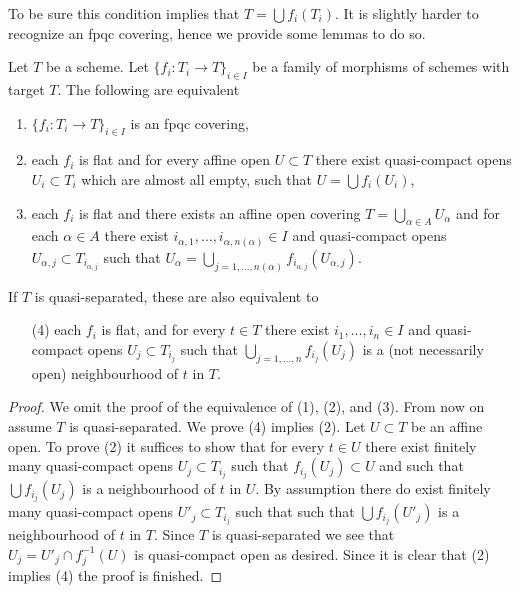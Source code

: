 \noindent
To be sure this condition implies that $T = \bigcup f_i(T_i)$.
It is slightly harder to recognize an fpqc covering, hence we provide
some lemmas to do so.

\begin{lemma}
\label{lemma-recognize-fpqc-covering}
Let $T$ be a scheme. Let $\{f_i : T_i \to T\}_{i \in I}$ be a family of
morphisms of schemes with target $T$. The following are equivalent
\begin{enumerate}
\item $\{f_i : T_i \to T\}_{i \in I}$ is an fpqc covering,
\item each $f_i$ is flat and for every affine open $U \subset T$
there exist quasi-compact opens
$U_i \subset T_i$ which are almost all empty,
such that $U = \bigcup f_i(U_i)$,
\item each $f_i$ is flat and there exists an affine open covering
$T = \bigcup_{\alpha \in A} U_\alpha$ and for each $\alpha \in A$
there exist $i_{\alpha, 1}, \ldots, i_{\alpha, n(\alpha)} \in I$
and quasi-compact opens $U_{\alpha, j} \subset T_{i_{\alpha, j}}$ such that
$U_\alpha =
\bigcup_{j = 1, \ldots, n(\alpha)} f_{i_{\alpha, j}}(U_{\alpha, j})$.
\end{enumerate}
If $T$ is quasi-separated, these are also equivalent to
\begin{enumerate}
\item[(4)] each $f_i$ is flat, and for every $t \in T$ there exist
$i_1, \ldots, i_n \in I$ and quasi-compact opens $U_j \subset T_{i_j}$
such that $\bigcup_{j = 1, \ldots, n} f_{i_j}(U_j)$ is a
(not necessarily open) neighbourhood of $t$ in $T$.
\end{enumerate}
\end{lemma}

\begin{proof}
We omit the proof of the equivalence of (1), (2), and (3).
From now on assume $T$ is quasi-separated.
We prove (4) implies (2). Let $U \subset T$ be an affine open.
To prove (2) it suffices to show that for every $t \in U$ there exist
finitely many quasi-compact opens $U_j \subset T_{i_j}$ such that
$f_{i_j}(U_j) \subset U$ and such that $\bigcup f_{i_j}(U_j)$
is a neighbourhood of $t$ in $U$. By assumption there do exist
finitely many quasi-compact opens $U'_j \subset T_{i_j}$ such that
such that $\bigcup f_{i_j}(U'_j)$ is a neighbourhood of $t$ in $T$.
Since $T$ is quasi-separated we see that $U_j = U'_j \cap f_j^{-1}(U)$
is quasi-compact open as desired. Since it is clear that (2) implies
(4) the proof is finished.
\end{proof}

